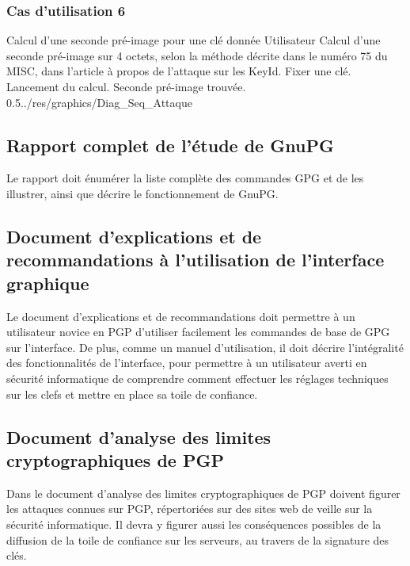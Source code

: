 \documentclass{../res/univ-projet}
\begin{document}
\subsubsection{Cas d'utilisation 6}
\ficheGraphic
{Calcul d'une seconde pré-image pour une clé donnée}
{Utilisateur}
{Calcul d'une seconde pré-image sur 4 octets, selon la méthode décrite dans le numéro 75 du MISC, dans l'article à propos de l'attaque sur les KeyId.}
{Fixer une clé.}
{Lancement du calcul.}
{Seconde pré-image trouvée.}
{0.5}{../res/graphics/Diag_Seq_Attaque}
{}
\vspace{0.5cm}


\subsection{Rapport complet de l'étude de GnuPG}

Le rapport doit énumérer la liste complète des commandes GPG et de les illustrer, ainsi que décrire le fonctionnement de GnuPG.


\subsection{Document d'explications et de recommandations à l'utilisation de l'interface graphique}

Le document d'explications et de recommandations doit permettre à un utilisateur novice en PGP d'utiliser facilement les commandes de base de GPG sur l'interface.
De plus, comme un manuel d'utilisation, il doit décrire l'intégralité des fonctionnalités de l'interface, pour permettre à un utilisateur averti en sécurité informatique de comprendre comment effectuer les réglages techniques sur les clefs et mettre en place sa toile de confiance.


\subsection{Document d'analyse des limites cryptographiques de PGP}

Dans le document d'analyse des limites cryptographiques de PGP doivent figurer les attaques connues sur PGP, répertoriées sur des sites web de veille sur la sécurité informatique. Il devra y figurer aussi les conséquences possibles de la diffusion de la toile de confiance sur les serveurs, au travers de la signature des clés.
\end{document}

